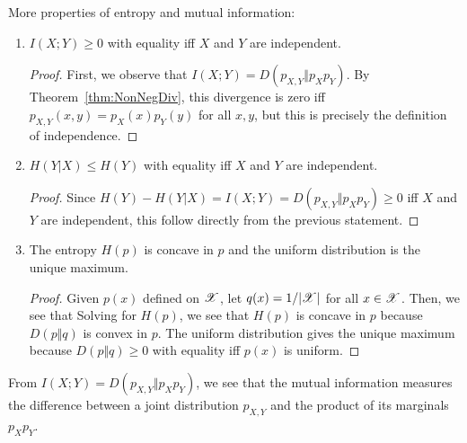 \documentclass[letterpaper,10pt,english]{article}
\begin{document}
\begin{lem}
More properties of entropy and mutual information:
\begin{enumerate}
\item $I (X; Y) \ge 0$ with equality iff $X$ and $Y$ are independent.
\begin{proof} 
First, we observe that $I(X;Y)=D(p_{X,Y}\Vert p_Xp_Y)$. 
By Theorem~\ref{thm:NonNegDiv}, this divergence is zero iff $p_{X,Y} (x, y) = p_X (x)p_Y (y)$ for all $x, y$, but this is precisely the definition of independence.
\end{proof} 
\item $H (Y |X) \le H (Y)$ with equality iff $X$ and $Y$ are independent.
\begin{proof} 
Since $H(Y)- H(Y|X) = I(X;Y) = D(p_{X,Y} \Vert p_Xp_Y) \ge 0$ iff $X$ and $Y$ are independent, this follow directly from the previous statement. 
\end{proof} 
\item The entropy $H(p)$ is concave in $p$ and the uniform distribution is the unique maximum. 
\begin{proof}
Given $p(x)$ defined on $\mathscr{X}$, let $q(x) = 1/|\mathscr{X}|$ for all $x \in \mathscr{X}$. 
Then, we see that 
Solving for $H(p)$, we see that $H(p)$ is concave in $p$ because $D(p\Vert q)$ is convex in $p$. The uniform distribution gives the unique maximum because $D(p\Vert q) \ge 0$ with equality iff 
$p(x)$ is uniform.
\end{proof} 
\end{enumerate}
\end{lem} 
\begin{rem} 
From $I(X ; Y) = D (p_{X,Y} \Vert p_X p_Y )$, we see that the mutual information measures the difference between a joint distribution $p_{X,Y}$ and the product of its marginals $p_X p_Y$. 
\end{rem}
    
\end{document}
